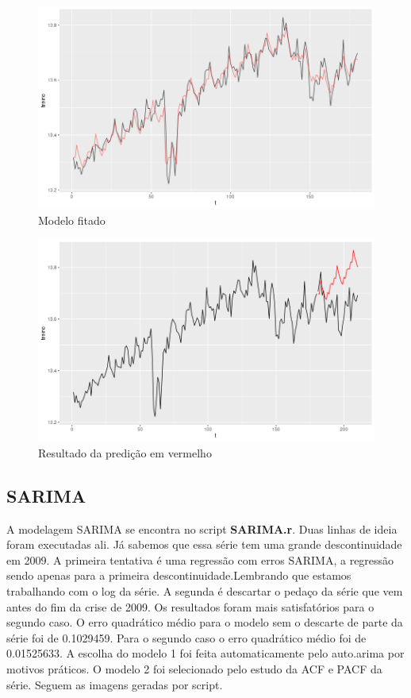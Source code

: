 \documentclass[10pt,a4paper]{article}
\begin{document}
\begin{figure}[h]
\centering
\includegraphics[width=.8 \linewidth]{../regressao_fitted_model.png} 
\caption{Modelo fitado}
\end{figure}

\begin{figure}[h]
\centering
\includegraphics[width=.8 \linewidth]{../predicted.png} 
\caption{Resultado da predição em vermelho}
\end{figure}

\newpage

\subsection{SARIMA}

A modelagem SARIMA se encontra no script \textbf{SARIMA.r}. Duas linhas de ideia foram executadas ali. Já sabemos que essa série tem uma grande descontinuidade em 2009. A primeira tentativa é uma regressão com erros SARIMA, a regressão sendo apenas para a primeira descontinuidade.Lembrando que estamos trabalhando com o log da série. A segunda é descartar o pedaço da série que vem antes do fim da crise de 2009. Os resultados foram mais satisfatórios para o segundo caso. O erro quadrático médio para o modelo sem o descarte de parte da série foi de 0.1029459. Para o segundo caso o erro quadrático médio foi de 0.01525633. A escolha do modelo 1 foi feita automaticamente pelo auto.arima por motivos práticos. O modelo 2 foi selecionado pelo estudo da ACF e PACF da série. Seguem as imagens geradas por script.
\end{document}
